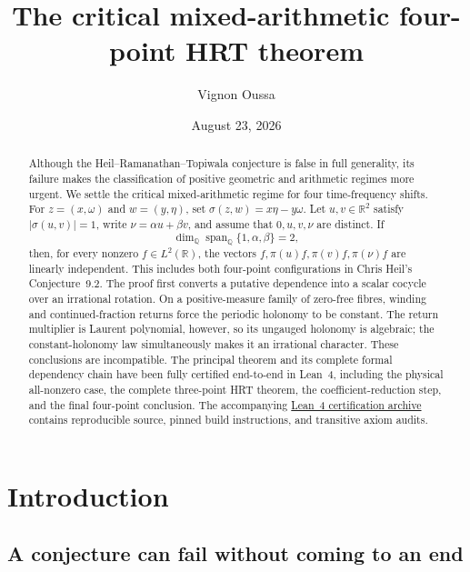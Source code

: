 \documentclass[reqno]{amsart}
\title[The critical mixed-arithmetic four-point HRT theorem]
{The critical mixed-arithmetic four-point HRT theorem}
\author{Vignon Oussa}
\date{August 23, 2026}
\theoremstyle{remark}
\numberwithin{equation}{section}
\newcommand{\R}{\mathbb{R}}
\newcommand{\Q}{\mathbb{Q}}
\begin{document}
\begin{abstract}
Although the Heil--Ramanathan--Topiwala conjecture is false in full
generality, its failure makes the classification of positive geometric and
arithmetic regimes more urgent. We settle the critical mixed-arithmetic
regime for four time-frequency shifts. For
\(z=(x,\omega)\) and \(w=(y,\eta)\), set
\(\sigma(z,w)=x\eta-y\omega\). Let \(u,v\in\R^2\) satisfy
\(\lvert\sigma(u,v)\rvert=1\), write \(\nu=\alpha u+\beta v\), and assume
that \(0,u,v,\nu\) are distinct. If
\[
  \dim_{\Q}\operatorname{span}_{\Q}\{1,\alpha,\beta\}=2,
\]
then, for every nonzero \(f\in L^2(\R)\), the vectors
\(f,\pi(u)f,\pi(v)f,\pi(\nu)f\) are linearly independent. This includes both
four-point configurations in Chris Heil's Conjecture~9.2. The proof first
converts a putative dependence into a scalar cocycle over an irrational
rotation. On a positive-measure family of zero-free fibres, winding and
continued-fraction returns force the periodic holonomy to be constant. The
return multiplier is Laurent polynomial, however, so its ungauged holonomy is
algebraic; the constant-holonomy law simultaneously makes it an irrational
character. These conclusions are incompatible. The principal theorem and its
complete formal dependency chain have been fully certified end-to-end in
Lean~4, including the physical all-nonzero case, the complete three-point HRT
theorem, the coefficient-reduction step, and the final four-point conclusion.
The accompanying
\href{https://www.dropbox.com/scl/fi/jd9xeqqera147wdc82r8k/3f260460-07d5-45f5-8d1c-ee1d2879c0af-aristotle-32-.tar.gz?rlkey=a24njadfds5ty9ez473lk03lv\&e=1\&dl=0}
{Lean~4 certification archive} contains reproducible source, pinned build
instructions, and transitive axiom audits.
\end{abstract}


\maketitle
\enlargethispage{2pt}

\section{Introduction}

\subsection{A conjecture can fail without coming to an end}
\end{document}

